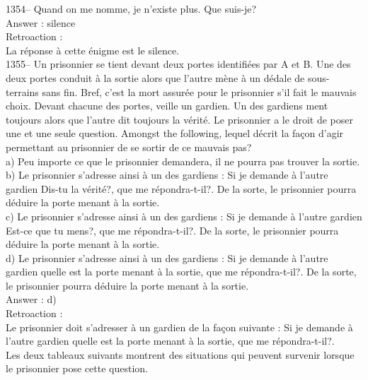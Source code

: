 ﻿\documentclass[letterpaper, 12pt]{article}
\begin{document}
1354-- Quand on me nomme, je n'existe plus.  Que suis-je?\\

Answer : silence\\

Retroaction : \\
La r\'eponse \`a cette \'enigme est le silence.\\

1355-- Un prisonnier se tient devant deux portes identifi\'ees par A et B.
Une des deux portes conduit \`a la sortie alors que l'autre m\`ene \`a un
d\'edale de sous-terrains sans fin.  Bref, c'est la mort assur\'ee pour le
prisonnier s'il fait le mauvais choix. Devant chacune des portes, veille un
gardien.  Un des gardiens ment toujours alors que l'autre dit toujours la
v\'erit\'e.  Le prisonnier a le droit de poser une et une seule question.
Amongst the following, lequel d\'ecrit la fa\c con d'agir
permettant au prisonnier de se sortir de ce mauvais pas?\\
a) Peu importe ce que le prisonnier demandera, il ne pourra pas trouver la
sortie.\\
b) Le prisonnier s'adresse ainsi \`a un des gardiens : \og Si je
demande \`a l'autre gardien \og Dis-tu la v\'erit\'e?\fg , que me
r\'epondra-t-il?\fg . De la
sorte, le prisonnier pourra d\'eduire la porte menant \`a la sortie.\\
c) Le prisonnier s'adresse ainsi \`a un des gardiens : \og Si je
demande \`a l'autre gardien \og Est-ce que tu mens?\fg , que me
r\'epondra-t-il?\fg . De la
sorte, le prisonnier pourra d\'eduire la porte menant \`a la sortie.\\
d) Le prisonnier s'adresse ainsi \`a un des gardiens : \og Si je
demande \`a l'autre gardien quelle est la porte menant \`a la
sortie, que me r\'epondra-t-il?\fg . De la sorte, le prisonnier
pourra d\'eduire la porte
menant \`a la sortie.\\

Answer : d)\\

Retroaction : \\
Le prisonnier doit s'adresser \`a un gardien de la fa\c con suivante
: \og Si je demande \`a l'autre gardien
quelle est la porte menant \`a la sortie, que me r\'epondra-t-il?\fg .\\
Les deux tableaux suivants montrent des situations qui peuvent survenir
lorsque le prisonnier pose cette question.  \\
\end{document}
